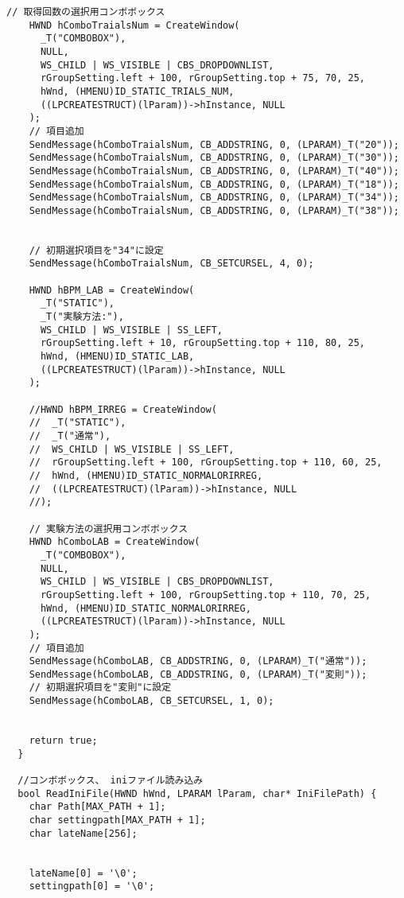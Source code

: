 \begin{lstlisting}[caption=window.cpp]
    // 取得回数の選択用コンボボックス
    HWND hComboTraialsNum = CreateWindow(
      _T("COMBOBOX"),
      NULL,
      WS_CHILD | WS_VISIBLE | CBS_DROPDOWNLIST,
      rGroupSetting.left + 100, rGroupSetting.top + 75, 70, 25,
      hWnd, (HMENU)ID_STATIC_TRIALS_NUM,
      ((LPCREATESTRUCT)(lParam))->hInstance, NULL
    );
    // 項目追加
    SendMessage(hComboTraialsNum, CB_ADDSTRING, 0, (LPARAM)_T("20"));
    SendMessage(hComboTraialsNum, CB_ADDSTRING, 0, (LPARAM)_T("30"));
    SendMessage(hComboTraialsNum, CB_ADDSTRING, 0, (LPARAM)_T("40"));
    SendMessage(hComboTraialsNum, CB_ADDSTRING, 0, (LPARAM)_T("18"));
    SendMessage(hComboTraialsNum, CB_ADDSTRING, 0, (LPARAM)_T("34"));
    SendMessage(hComboTraialsNum, CB_ADDSTRING, 0, (LPARAM)_T("38"));


    // 初期選択項目を"34"に設定
    SendMessage(hComboTraialsNum, CB_SETCURSEL, 4, 0);
    
    HWND hBPM_LAB = CreateWindow(
      _T("STATIC"),
      _T("実験方法:"),
      WS_CHILD | WS_VISIBLE | SS_LEFT,
      rGroupSetting.left + 10, rGroupSetting.top + 110, 80, 25,
      hWnd, (HMENU)ID_STATIC_LAB,
      ((LPCREATESTRUCT)(lParam))->hInstance, NULL
    );

    //HWND hBPM_IRREG = CreateWindow(
    //	_T("STATIC"),
    //	_T("通常"),
    //	WS_CHILD | WS_VISIBLE | SS_LEFT,
    //	rGroupSetting.left + 100, rGroupSetting.top + 110, 60, 25,
    //	hWnd, (HMENU)ID_STATIC_NORMALORIRREG,
    //	((LPCREATESTRUCT)(lParam))->hInstance, NULL
    //);
    
    // 実験方法の選択用コンボボックス
    HWND hComboLAB = CreateWindow(
      _T("COMBOBOX"),
      NULL,
      WS_CHILD | WS_VISIBLE | CBS_DROPDOWNLIST,
      rGroupSetting.left + 100, rGroupSetting.top + 110, 70, 25,
      hWnd, (HMENU)ID_STATIC_NORMALORIRREG,
      ((LPCREATESTRUCT)(lParam))->hInstance, NULL
    );
    // 項目追加
    SendMessage(hComboLAB, CB_ADDSTRING, 0, (LPARAM)_T("通常"));
    SendMessage(hComboLAB, CB_ADDSTRING, 0, (LPARAM)_T("変則"));
    // 初期選択項目を"変則"に設定
    SendMessage(hComboLAB, CB_SETCURSEL, 1, 0);


    return true;
  }

  //コンボボックス、 iniファイル読み込み
  bool ReadIniFile(HWND hWnd, LPARAM lParam, char* IniFilePath) {
    char Path[MAX_PATH + 1];
    char settingpath[MAX_PATH + 1];
    char lateName[256];


    lateName[0] = '\0';
    settingpath[0] = '\0';


\end{lstlisting}
